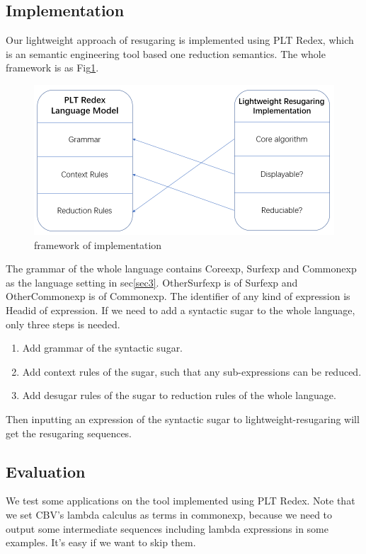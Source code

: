 \subsection{Implementation}

Our lightweight approach of resugaring is implemented using PLT Redex\cite{SEwPR}, which is an semantic engineering tool based one reduction semantics. The whole framework is as Fig\ref{fig:frame}.

\begin{figure}[h]
	\centering
	\includegraphics[width=12cm]{images/frame.png}
	\caption{framework of implementation}
	\label{fig:frame}
\end{figure}

The grammar of the whole language contains Coreexp, Surfexp and Commonexp as the language setting in sec\ref{sec3}. OtherSurfexp is of Surfexp and OtherCommonexp is of Commonexp. The identifier of any kind of expression is Headid of expression. If we need to add a syntactic sugar to the whole language, only three steps is needed.

\begin{enumerate}
\item Add grammar of the syntactic sugar.
\item Add context rules of the sugar, such that any sub-expressions can be reduced.
\item Add desugar rules of the sugar to reduction rules of the whole language.
\end{enumerate}

Then inputting an expression of the syntactic sugar to lightweight-resugaring will get the resugaring sequences.

\subsection{Evaluation}

We test some applications on the tool implemented using PLT Redex. Note that we set CBV's lambda calculus as terms in commonexp, because we need to output some intermediate sequences including lambda expressions in some examples. It's easy if we want to skip them.

